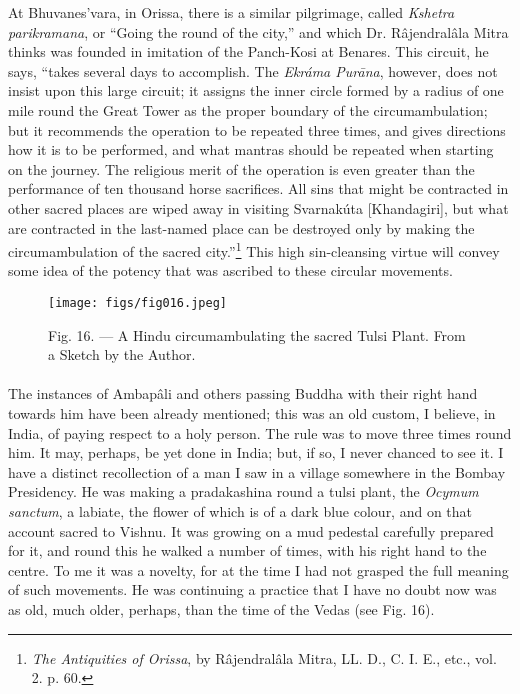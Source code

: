 \documentclass[a4paper, 11pt, oneside, polutonikogreek, english]{article}
\begin{document}
At Bhuvanes'vara, in Orissa, there is a similar pilgrimage, called \emph{Kshetra parikramana}, or ``Going the round of the city,'' and which Dr. Râjendralâla Mitra thinks was founded in imitation of the Panch-Kosi at Benares. This circuit, he says, ``takes several days to accomplish. The \emph{Ekráma Purāna}, however, does not insist upon this large circuit; it assigns the inner circle formed by a radius of one mile round the Great Tower as the proper boundary of the circumambulation; but it recommends the operation to be repeated three times, and gives directions how it is to be performed, and what mantras should be repeated when starting on the journey. The religious merit of the operation is even greater than the performance of ten thousand horse sacrifices. All sins that might be contracted in other sacred places are wiped away in visiting Svarnakúta [Khandagiri], but what are contracted in the last-named place can be destroyed only by making the circumambulation of the sacred city.''\footnote{\emph{The Antiquities of Orissa}, by Râjendralâla Mitra, LL. D., C. I. E., etc., vol. 2. p. 60.} This high sin-cleansing virtue will convey some idea of the potency that was ascribed to these circular movements.

\begin{figure}[H]
\centering
\texttt{[image: figs/fig016.jpeg]}
\caption{Fig. 16. --- A Hindu circumambulating the sacred Tulsi Plant. From a Sketch by the Author.}
\end{figure}
\paragraph{}
The instances of Ambapâli and others passing Buddha with their right hand towards him have been already mentioned; this was an old custom, I believe, in India, of paying respect to a holy person. The rule was to move three times round him. It may, perhaps, be yet done in India; but, if so, I never chanced to see it. I have a distinct recollection of a man I saw in a village somewhere in the Bombay Presidency. He was making a pradakashina round a tulsi plant, the \emph{Ocymum sanctum}, a labiate, the flower of which is of a dark blue colour, and on that account sacred to Vishnu. It was growing on a mud pedestal carefully prepared for it, and round this he walked a number of times, with his right hand to the centre. To me it was a novelty, for at the time I had not grasped the full meaning of such movements. He was continuing a practice that I have no doubt now was as old, much older, perhaps, than the time of the Vedas (see Fig. 16).
\end{document}
